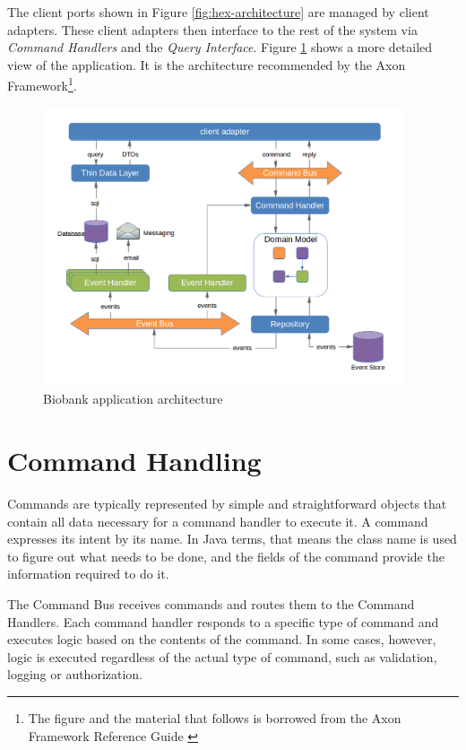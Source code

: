 The client ports shown in Figure \ref{fig:hex-architecture} are managed by
client adapters. These client adapters then interface to the rest of the system
via \emph{Command Handlers} and the \emph{Query Interface}. Figure
\ref{fig:cqrs-architecture} shows a more detailed view of the application. It
is the architecture recommended by the Axon Framework\footnote{The figure and
  the material that follows is borrowed from the Axon Framework Reference Guide
  \cite{AxonOnline}}.

\begin{figure}[h]
\includegraphics[width=0.95\textwidth]{images/cqrs-architecture}
\caption{Biobank application architecture}
\label{fig:cqrs-architecture}
\end{figure}

\section*{Command Handling}

Commands are typically represented by simple and straightforward objects that
contain all data necessary for a command handler to execute it. A command
expresses its intent by its name. In Java terms, that means the class name is
used to figure out what needs to be done, and the fields of the command provide
the information required to do it.

The Command Bus receives commands and routes them to the Command Handlers. Each
command handler responds to a specific type of command and executes logic based
on the contents of the command. In some cases, however, logic is executed
regardless of the actual type of command, such as validation, logging or
authorization.

